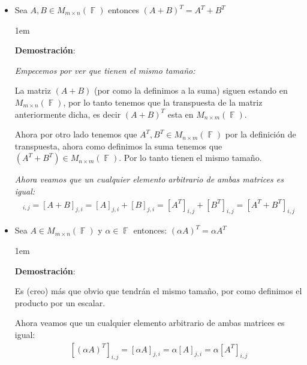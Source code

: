 \documentclass[12pt, fleqn]{article}                             %
\newenvironment{SmallIndentation}[1][0.75em]                    %
        {\begin{adjustwidth}{#1}{}\begin{footnotesize}}             %
        {\end{footnotesize}\end{adjustwidth}}                       %
\theoremstyle{break}                                            %
\DeclareMathOperator \GenericField {\mathbb{F}}                 %
\newcommand{\Brackets}[1]    {\left[ #1 \right]}                %
\begin{document}
    \begin{itemize}

        \item Sea $A,B \in M_{m \times n}(\GenericField)$ entonces 
            $(A+B)^T = A^T + B^T$

            \begin{SmallIndentation}[1em]
                \textbf{Demostración}:

                \emph{Empecemos por ver que tienen el mismo tamaño:}

                La matriz $(A+B)$ (por como la definimos a la suma) siguen estando en 
                $M_{m \times n}(\GenericField)$, por lo tanto tenemos que la transpuesta de la 
                matriz anteriormente dicha, es decir $(A+B)^T$ esta en $M_{n \times m}(\GenericField)$.

                Ahora por otro lado tenemos que $A^T, B^T \in M_{n \times m}(\GenericField)$ por la
                definición de transpuesta, ahora como definimos la suma tenemos que 
                $(A^T+B^T) \in M_{n \times m}(\GenericField)$.
                Por lo tanto tienen el mismo tamaño.

                \emph{Ahora veamos que un cualquier elemento arbitrario de ambas matrices es igual:}
                \begin{align*}
                    [(A+B)^T]_{i, j}    
                        = [A + B]_{j, i}               
                        = [A]_{j, i} + [B]_{j, i}      
                        = [A^T]_{i, j} + [B^T]_{i, j}
                        = \Brackets{A^T + B^T}_{i, j}
                \end{align*}

            \end{SmallIndentation}

        \item Sea $A \in M_{m \times n}(\GenericField)$ y $\alpha \in \GenericField$ entonces:
            $(\alpha A)^T = \alpha A^T$
            
            \begin{SmallIndentation}[1em]
                \textbf{Demostración}:

                Es (creo) más que obvio que tendrán el mismo tamaño, por como definimos el producto
                por un escalar.

                Ahora veamos que un cualquier elemento arbitrario de ambas matrices es igual:
                \begin{equation*}
                \begin{split}
                    [(\alpha A)^T]_{i, j}    
                        = [\alpha A]_{j, i}               
                        = \alpha [A]_{j, i}
                        = \alpha [A^T]_{i, j}
                \end{split}
                \end{equation*}


\end{SmallIndentation}
\end{itemize}
\end{document}
